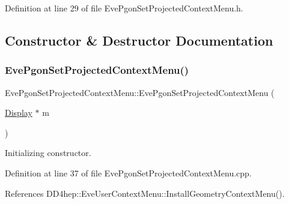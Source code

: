 Definition at line 29 of file Eve\+Pgon\+Set\+Projected\+Context\+Menu.\+h.



\subsection{Constructor \& Destructor Documentation}
\hypertarget{class_d_d4hep_1_1_eve_pgon_set_projected_context_menu_abb2c75b86df13a70ed20d3d14c7b6416}{}\label{class_d_d4hep_1_1_eve_pgon_set_projected_context_menu_abb2c75b86df13a70ed20d3d14c7b6416} 
\subsubsection{\texorpdfstring{Eve\+Pgon\+Set\+Projected\+Context\+Menu()}{EvePgonSetProjectedContextMenu()}}
{\footnotesize\ttfamily Eve\+Pgon\+Set\+Projected\+Context\+Menu\+::\+Eve\+Pgon\+Set\+Projected\+Context\+Menu (\begin{DoxyParamCaption}\item[{\hyperlink{class_d_d4hep_1_1_display}{Display} $\ast$}]{m }\end{DoxyParamCaption})\hspace{0.3cm}{\ttfamily [protected]}}



Initializing constructor. 



Definition at line 37 of file Eve\+Pgon\+Set\+Projected\+Context\+Menu.\+cpp.



References D\+D4hep\+::\+Eve\+User\+Context\+Menu\+::\+Install\+Geometry\+Context\+Menu().

\hypertarget{class_d_d4hep_1_1_eve_pgon_set_projected_context_menu_a2872930488e4ef2ef159f765acaea703}{}\label{class_d_d4hep_1_1_eve_pgon_set_projected_context_menu_a2872930488e4ef2ef159f765acaea703} 
